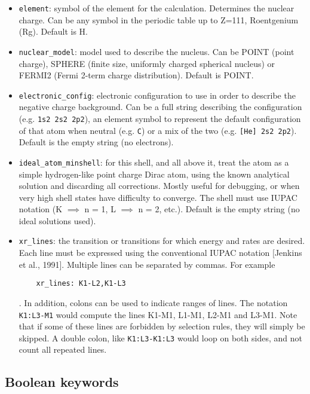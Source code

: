 \documentclass[]{article}
\begin{document}
\begin{itemize}
	\item \texttt{element}: symbol of the element for the calculation. Determines the nuclear charge. Can be any symbol in the periodic table up to Z=111, Roentgenium (Rg). Default is H.
	\item \texttt{nuclear\_model}: model used to describe the nucleus. Can be POINT (point charge), SPHERE (finite size, uniformly charged spherical nucleus) or FERMI2 (Fermi 2-term charge distribution). Default is POINT.
	\item \texttt{electronic\_config}: electronic configuration to use in order to describe the negative charge background. Can be a full string describing the configuration (e.g. \texttt{1s2 2s2 2p2}), an element symbol to represent the default configuration of that atom when neutral (e.g. \texttt{C}) or a mix of the two (e.g. \texttt{[He] 2s2 2p2}). Default is the empty string (no electrons).
	\item \texttt{ideal\_atom\_minshell}: for this shell, and all above it, treat the atom as a simple hydrogen-like point charge Dirac atom, using the known analytical solution and discarding all corrections. Mostly useful for debugging, or when very high shell states have difficulty to converge. The shell must use IUPAC notation (K $\implies$ n = 1, L $\implies$ n = 2, etc.). Default is the empty string (no ideal solutions used).
	\item \texttt{xr\_lines}: the transition or transitions for which energy and rates are desired. Each line must be expressed using the conventional IUPAC notation [Jenkins et al., 1991]. Multiple lines can be separated by commas. For example
	
	\begin{verbatim}
	xr_lines: K1-L2,K1-L3
	\end{verbatim}
	
	. In addition, colons can be used to indicate ranges of lines. The notation \texttt{K1:L3-M1} would compute the lines K1-M1, L1-M1, L2-M1 and L3-M1. Note that if some of these lines are forbidden by selection rules, they will simply be skipped. A double colon, like \texttt{K1:L3-K1:L3} would loop on both sides, and not count all repeated lines. 
	
\end{itemize}

\subsection{Boolean keywords}
\end{document}
